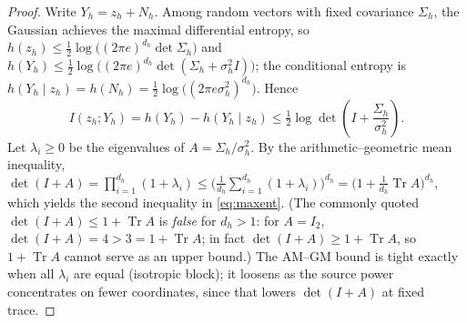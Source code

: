 \documentclass[10pt,twocolumn,letterpaper]{article}
\theoremstyle{plain}
\theoremstyle{definition}
\begin{document}
\begin{proof}
Write $Y_h=z_h+N_h$. Among random vectors with fixed covariance $\Sigma_h$, the
Gaussian achieves the maximal differential entropy, so
$h(z_h)\le\tfrac12\log\big((2\pi e)^{d_h}\det\Sigma_h\big)$ and
$h(Y_h)\le\tfrac12\log\big((2\pi e)^{d_h}\det(\Sigma_h+\sigma_h^{2}I)\big)$;
the conditional entropy is
$h(Y_h\mid z_h)=h(N_h)=\tfrac12\log\big((2\pi e\sigma_h^{2})^{d_h}\big)$. Hence
\begin{equation*}
I(z_h;Y_h)=h(Y_h)-h(Y_h\mid z_h)
\le \tfrac12\log\det\!\left(I+\frac{\Sigma_h}{\sigma_h^{2}}\right).
\end{equation*}
Let $\lambda_i\ge0$ be the eigenvalues of $A=\Sigma_h/\sigma_h^{2}$. By the
arithmetic--geometric mean inequality,
$\det(I+A)=\prod_{i=1}^{d_h}(1+\lambda_i)
\le\big(\tfrac{1}{d_h}\sum_{i=1}^{d_h}(1+\lambda_i)\big)^{d_h}
=\big(1+\tfrac{1}{d_h}\operatorname{Tr}A\big)^{d_h}$, which yields the second
inequality in \eqref{eq:maxent}. (The commonly quoted $\det(I+A)\le1+\operatorname{Tr}A$
is \emph{false} for $d_h>1$: for $A=I_2$, $\det(I+A)=4>3=1+\operatorname{Tr}A$;
in fact $\det(I+A)\ge1+\operatorname{Tr}A$, so $1+\operatorname{Tr}A$ cannot serve
as an upper bound.) The AM--GM bound is tight exactly when all $\lambda_i$ are
equal (isotropic block); it loosens as the source power concentrates on fewer
coordinates, since that lowers $\det(I+A)$ at fixed trace.
\end{proof}
\end{document}
